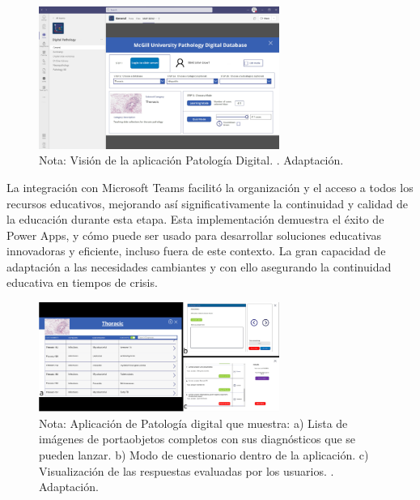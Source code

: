 \documentclass[letter,oneside,12pt,spanish]{report}
\begin{document}
\begin{figure}[ht]
    \centering
    \includegraphics[width=0.7\textwidth]{Figs/mcgill university.png}
    \label{fig:McGuill}
    \\Nota: Visión de la aplicación Patología Digital. \cite{rajaram2022pathology}. Adaptación.
\end{figure}



\noindent La integración con Microsoft Teams facilitó la organización y el acceso a todos los recursos educativos, mejorando así significativamente la continuidad y calidad de la educación durante esta etapa. Esta implementación demuestra el éxito de Power Apps, y cómo puede ser usado para desarrollar soluciones educativas innovadoras y eficiente, incluso fuera de este contexto. La gran capacidad de adaptación a las necesidades cambiantes y con ello asegurando la continuidad educativa en tiempos de crisis.


\begin{figure}[ht]
    \centering
    \includegraphics[width=0.7\textwidth]{Figs/mcgill university aplication.png}
    \label{fig:McGuillAPP}
    \\Nota: Aplicación de Patología digital que muestra: a) Lista de imágenes de portaobjetos completos con sus diagnósticos   que se pueden lanzar. b) Modo de cuestionario dentro de la aplicación. c) Visualización de las respuestas evaluadas por los usuarios. \cite{rajaram2022pathology}. Adaptación.
\end{figure}
\end{document}
